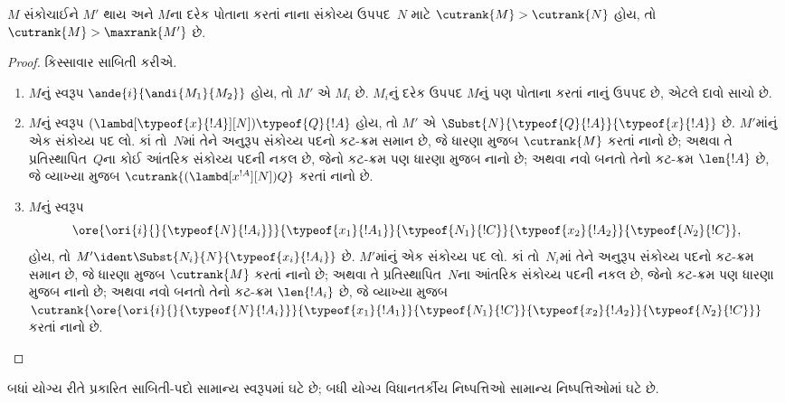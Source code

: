 \begin{lem}
  $M$ સંકોચાઈને $M'$ થાય અને $M$ના દરેક પોતાના કરતાં
  નાના સંકોચ્ય ઉપપદ~$N$ માટે $\cutrank{M} > \cutrank{N}$
  હોય, તો $\cutrank{M} > \maxrank{M'}$ છે.
\end{lem}

\begin{proof}
  કિસ્સાવાર સાબિતી કરીએ.
  \begin{enumerate}
  \item $M$નું સ્વરૂપ $\ande{i}{\andi{M_1}{M_2}}$ હોય,
    તો $M'$ એ $M_i$ છે. $M_i$નું દરેક ઉપપદ
    $M$નું પણ પોતાના કરતાં નાનું ઉપપદ છે,
    એટલે દાવો સાચો છે.
  \item $M$નું સ્વરૂપ
    $(\lambd[\typeof{x}{!A}][N])\typeof{Q}{!A}$ હોય, તો
    $M'$ એ $\Subst{N}{\typeof{Q}{!A}}{\typeof{x}{!A}}$ છે.
    $M'$માંનું એક સંકોચ્ય પદ લો. કાં તો~$N$માં
    તેને અનુરૂપ સંકોચ્ય પદનો કટ-ક્રમ સમાન છે,
    જે ધારણા મુજબ $\cutrank{M}$ કરતાં નાનો છે;
    અથવા તે પ્રતિસ્થાપિત~$Q$ના કોઈ આંતરિક સંકોચ્ય
    પદની નકલ છે, જેનો કટ-ક્રમ પણ ધારણા મુજબ નાનો છે;
    અથવા નવો બનતો તેનો કટ-ક્રમ $\len{!A}$ છે, જે વ્યાખ્યા મુજબ
    $\cutrank{(\lambd[x^{!A}][N])Q}$ કરતાં નાનો છે.
  \item $M$નું સ્વરૂપ
    \[
    \ore{\ori{i}{}{\typeof{N}{!A_i}}}
        {\typeof{x_1}{!A_1}}{\typeof{N_1}{!C}}
        {\typeof{x_2}{!A_2}}{\typeof{N_2}{!C}},
    \]
    હોય, તો $M' \ident \Subst{N_i}{N}{\typeof{x_i}{!A_i}}$ છે.
    $M'$માંનું એક સંકોચ્ય પદ લો. કાં તો~$N_i$માં
    તેને અનુરૂપ સંકોચ્ય પદનો કટ-ક્રમ સમાન છે,
    જે ધારણા મુજબ $\cutrank{M}$ કરતાં નાનો છે;
    અથવા તે પ્રતિસ્થાપિત~$N$ના આંતરિક સંકોચ્ય
    પદની નકલ છે, જેનો કટ-ક્રમ પણ ધારણા મુજબ નાનો છે;
    અથવા નવો બનતો તેનો કટ-ક્રમ $\len{!A_i}$ છે, જે વ્યાખ્યા મુજબ
    $\cutrank{\ore{\ori{i}{}{\typeof{N}{!A_i}}}
      {\typeof{x_1}{!A_1}}{\typeof{N_1}{!C}}
      {\typeof{x_2}{!A_2}}{\typeof{N_2}{!C}}}$ કરતાં નાનો છે.
  \end{enumerate}
  
\end{proof}

\begin{thm}
  બધાં યોગ્ય રીતે પ્રકારિત સાબિતી-પદો સામાન્ય સ્વરૂપમાં ઘટે છે;
  બધી યોગ્ય વિધાનતર્કીય નિષ્પત્તિઓ સામાન્ય
  નિષ્પત્તિઓમાં ઘટે છે.
\end{thm}

